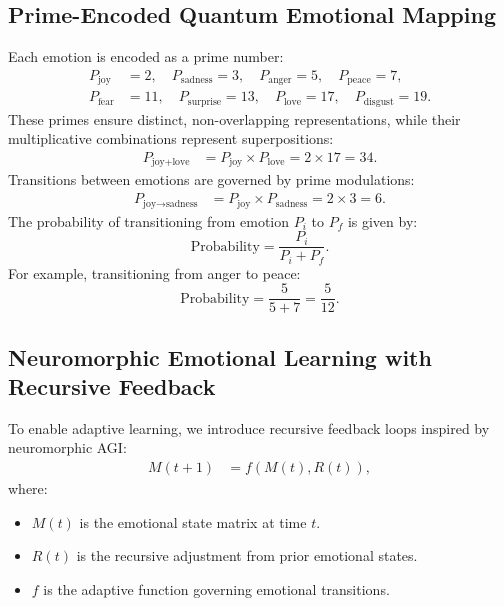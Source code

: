 \documentclass{article}
\theoremstyle{plain}
\begin{document}
\begin{itemize}
\begin{itemize}
\subsection{Prime-Encoded Quantum Emotional Mapping}
Each emotion is encoded as a prime number:
\begin{align}
    P_{\text{joy}} &= 2, \quad P_{\text{sadness}} = 3, \quad P_{\text{anger}} = 5, \quad P_{\text{peace}} = 7, \\
    P_{\text{fear}} &= 11, \quad P_{\text{surprise}} = 13, \quad P_{\text{love}} = 17, \quad P_{\text{disgust}} = 19.
\end{align}
These primes ensure distinct, non-overlapping representations, while their multiplicative combinations represent superpositions:
\begin{align}
    P_{\text{joy+love}} &= P_{\text{joy}} \times P_{\text{love}} = 2 \times 17 = 34.
\end{align}
Transitions between emotions are governed by prime modulations:
\begin{align}
    P_{\text{joy} \rightarrow \text{sadness}} &= P_{\text{joy}} \times P_{\text{sadness}} = 2 \times 3 = 6.
\end{align}
The probability of transitioning from emotion \( P_i \) to \( P_f \) is given by:
\begin{equation}
    \text{Probability} = \frac{P_i}{P_i + P_f}.
\end{equation}
For example, transitioning from anger to peace:
\begin{equation}
    \text{Probability} = \frac{5}{5+7} = \frac{5}{12}.
\end{equation}

\subsection{Neuromorphic Emotional Learning with Recursive Feedback}
To enable adaptive learning, we introduce recursive feedback loops inspired by neuromorphic AGI:
\begin{align}
    M(t+1) &= f(M(t), R(t)),
\end{align}
where:
\begin{itemize}
    \item \( M(t) \) is the emotional state matrix at time \( t \).
    \item \( R(t) \) is the recursive adjustment from prior emotional states.
    \item \( f \) is the adaptive function governing emotional transitions.
\end{itemize}


\end{itemize}
\end{itemize}
\end{document}
